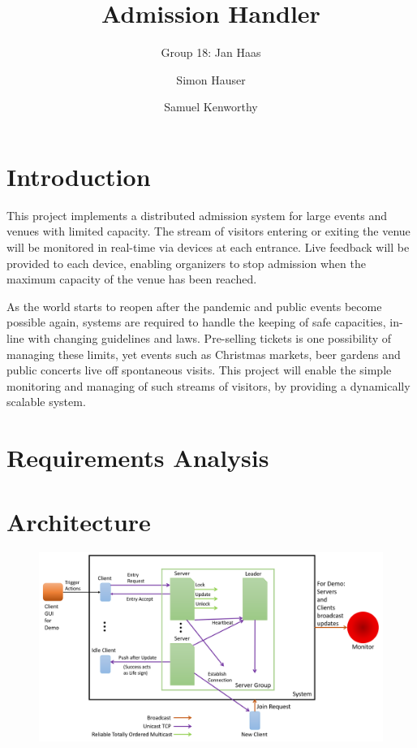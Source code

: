 \documentclass[runningheads]{llncs}
\begin{document}
%
\title{Admission Handler}

\author{Group 18: Jan Haas \and Simon Hauser \and Samuel Kenworthy}

\institute{}
%
\maketitle              %

\section{Introduction}
This project implements a distributed admission system for large events and venues with limited capacity.
The stream of visitors entering or exiting the venue will be monitored in real-time via devices at each entrance.
Live feedback will be provided to each device, enabling organizers to stop admission when the maximum capacity of the venue has been reached.

As the world starts to reopen after the pandemic and public events become possible again, systems are required to handle the keeping of safe capacities, in-line with changing guidelines and laws.
Pre-selling tickets is one possibility of managing these limits, yet events such as Christmas markets, beer gardens and public concerts live off spontaneous visits.
This project will enable the simple monitoring and managing of such streams of visitors, by providing a dynamically scalable system.

\section{Requirements Analysis}



\newpage
\section{Architecture}
\begin{figure}
\includegraphics[width=\textwidth]{Architecture_Diagram_new.png}
\end{figure}
\end{document}

